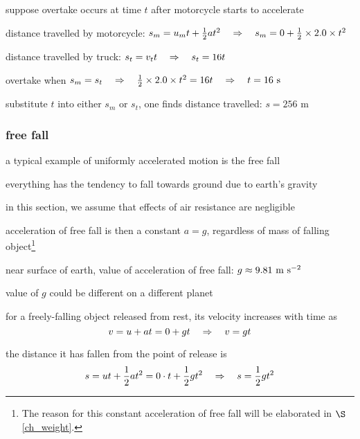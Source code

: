
\sol suppose overtake occurs at time $t$ after motorcycle starts to accelerate

distance travelled by motorcycle: $s_m = u_mt + \frac{1}{2}at^2  \quad \Rightarrow \quad s_m = 0 + \frac{1}{2}\times 2.0 \times t^2$

distance travelled by truck: $s_t = v_t t \quad \Rightarrow \quad s_t = 16t$

overtake when $s_m = s_t \quad \Rightarrow \quad \frac{1}{2}\times 2.0 \times t^2 = 16 t \quad \Rightarrow \quad t=16 \text{ s}$

substitute $t$ into either $s_m$ or $s_t$, one finds distance travelled: $s = 256 \text{ m}$ \eoe




\subsubsection{free fall}\label{ch_freefall}

a typical example of uniformly accelerated motion is the free fall

everything has the tendency to fall towards ground due to earth's gravity

in this section, we assume that effects of air resistance are negligible

acceleration of free fall is then a constant $a=g$, regardless of mass of falling object\footnote{The reason for this constant acceleration of free fall will be elaborated in $\S$\ref{ch_weight}.}

\cmt near surface of earth, value of acceleration of free fall: $g\approx9.81\text{ m s$^{-2}$}$

value of $g$ could be different on a different planet

\cmt for a freely-falling object released from rest, its velocity increases with time as
\begin{equation*}
	v=u+at = 0 + gt \quad \Rightarrow \quad v = gt
\end{equation*}

the distance it has fallen from the point of release is
\begin{equation*}
s=ut+\frac{1}{2} at^2 = 0\cdot t + \frac{1}{2}gt^2 \quad \Rightarrow \quad s=\frac{1}{2}gt^2
\end{equation*}

